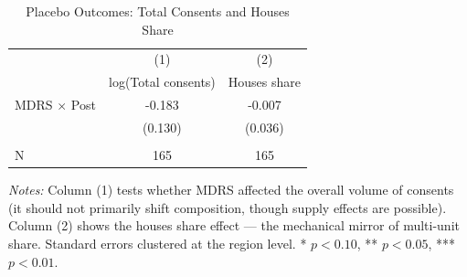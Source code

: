 \begin{table}[H]
\centering
\caption{Placebo Outcomes: Total Consents and Houses Share}
\label{tab:placebo}
\begin{threeparttable}
\begin{tabular}{lcc}
\toprule
 & (1) & (2) \\
 & log(Total consents) & Houses share \\
\midrule
MDRS $\times$ Post & -0.183 & -0.007 \\
 & (0.130) & (0.036) \\
\\
N & 165 & 165 \\
\bottomrule
\end{tabular}
\begin{tablenotes}[flushleft]
\small
\item \textit{Notes:} Column (1) tests whether MDRS affected the overall volume of consents (it should not primarily shift composition, though supply effects are possible). Column (2) shows the houses share effect — the mechanical mirror of multi-unit share. Standard errors clustered at the region level. * $p<0.10$, ** $p<0.05$, *** $p<0.01$.
\end{tablenotes}
\end{threeparttable}
\end{table}
